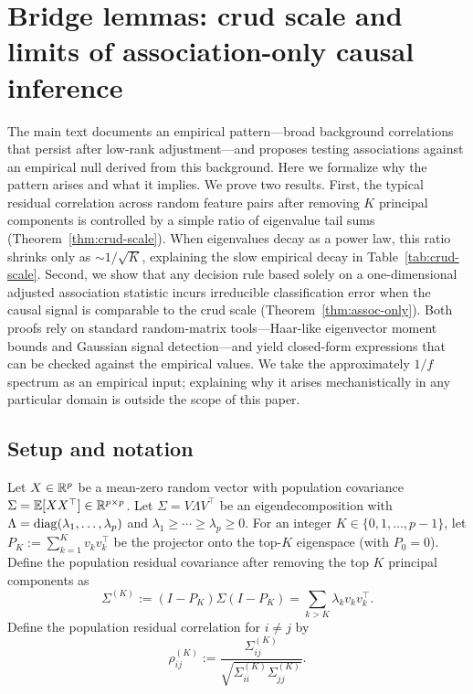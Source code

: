 \section{Bridge lemmas: crud scale and limits of association-only causal inference}
\label{app:bridge-lemmas}

The main text documents an empirical pattern---broad background correlations that persist after low-rank adjustment---and proposes testing associations against an empirical null derived from this background.  Here we formalize why the pattern arises and what it implies.  We prove two results.  First, the typical residual correlation across random feature pairs after removing $K$ principal components is controlled by a simple ratio of eigenvalue tail sums (Theorem~\ref{thm:crud-scale}).  When eigenvalues decay as a power law, this ratio shrinks only as $\sim 1/\sqrt{K}$, explaining the slow empirical decay in Table~\ref{tab:crud-scale}.  Second, we show that any decision rule based solely on a one-dimensional adjusted association statistic incurs irreducible classification error when the causal signal is comparable to the crud scale (Theorem~\ref{thm:assoc-only}).  Both proofs rely on standard random-matrix tools---Haar-like eigenvector moment bounds and Gaussian signal detection---and yield closed-form expressions that can be checked against the empirical values. We take the approximately $1/f$ spectrum as an empirical input; explaining why it arises mechanistically in any particular domain is outside the scope of this paper.

\subsection{Setup and notation}

Let $X\in\mathbb{R}^p$ be a mean-zero random vector with population covariance
$\Sigma=\mathbb{E}[XX^\top]\in\mathbb{R}^{p\times p}$.
Let $\Sigma=V\Lambda V^\top$ be an eigendecomposition with
$\Lambda=\operatorname{diag}(\lambda_1,\ldots,\lambda_p)$ and $\lambda_1\ge\cdots\ge\lambda_p\ge 0$.
For an integer $K\in\{0,1,\ldots,p-1\}$, let $P_K:=\sum_{k=1}^K v_k v_k^\top$ be the projector
onto the top-$K$ eigenspace (with $P_0=0$). Define the population residual covariance after removing
the top $K$ principal components as
\begin{equation}
\Sigma^{(K)} := (I-P_K)\Sigma(I-P_K) = \sum_{k>K}\lambda_k v_k v_k^\top.
\end{equation}
Define the population residual correlation for $i\neq j$ by
\begin{equation}
\rho^{(K)}_{ij} := \frac{\Sigma^{(K)}_{ij}}{\sqrt{\Sigma^{(K)}_{ii}\Sigma^{(K)}_{jj}}}.
\end{equation}


